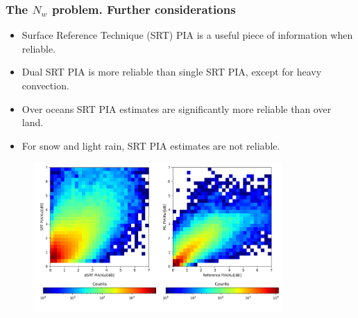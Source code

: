 \documentclass{beamer}
\begin{document}
\begin{frame}
\frametitle{The $N_w$ problem. Further considerations}
\begin{itemize}
\item Surface Reference Technique (SRT) PIA is a useful piece of information when reliable.
\item Dual SRT PIA is more reliable than single SRT PIA, except for heavy convection.
\item Over oceans SRT PIA estimates are significantly more reliable than over land.
\item For snow and light rain, SRT PIA estimates are not reliable.
\end{itemize}
\begin{figure}
\begin{center}
\includegraphics[width=0.85\textwidth]{Figures/fig6.png}
\end{center}
\end{figure}
\end{frame}
\end{document}
